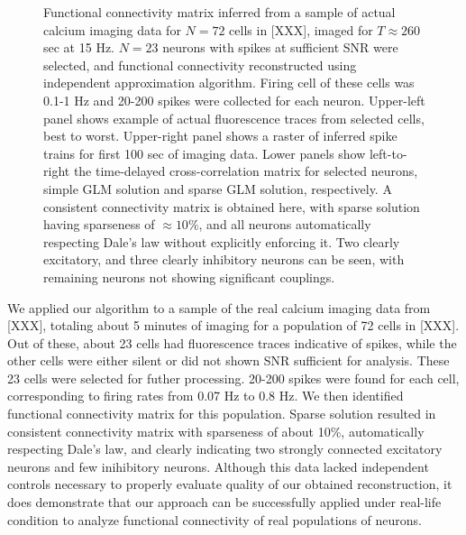 \begin{figure}[h]
\begin{minipage}[c]{0.3\hsize}
\end{minipage}
\caption{Functional connectivity matrix inferred from a sample of actual calcium imaging data for $N=72$ cells in [XXX], imaged for $T\approx 260$ sec at 15 Hz. 
$N=23$ neurons with spikes at sufficient SNR were selected, and functional connectivity reconstructed using independent approximation algorithm. Firing cell of these cells was 0.1-1 Hz and 20-200 spikes were collected for each neuron.
Upper-left panel shows example of actual fluorescence traces from selected cells, best to worst. Upper-right panel shows a raster of inferred spike trains for first 100 sec of imaging data. Lower panels show left-to-right the time-delayed cross-correlation matrix for selected neurons, simple GLM solution and sparse GLM solution, respectively. A consistent connectivity matrix is obtained here, with sparse solution having sparseness of $\approx 10 \%$, and all neurons automatically respecting Dale's law without explicitly enforcing it. Two clearly excitatory, and three clearly inhibitory neurons can be seen, with remaining neurons not showing significant couplings.}
\label{fig:real}
\end{figure}


We applied our algorithm to a sample of the real calcium imaging data from [XXX], totaling about 5 minutes of imaging for a population of 72 cells in [XXX]. Out of these, about 23 cells had fluorescence traces indicative of spikes, while the other cells were either silent or did not shown SNR sufficient for analysis. These 23 cells were selected for futher processing. 20-200 spikes were found for each cell, corresponding to firing rates from 0.07 Hz to 0.8 Hz.
We then identified functional connectivity matrix for this population. Sparse solution resulted in consistent connectivity matrix with sparseness of about 10\%, automatically respecting Dale's law, and clearly indicating two strongly connected excitatory neurons and few inihibitory neurons. Although this data lacked independent controls necessary to properly evaluate quality of our obtained reconstruction, it does demonstrate that our approach can be successfully applied under real-life condition to analyze functional connectivity of real populations of neurons.
